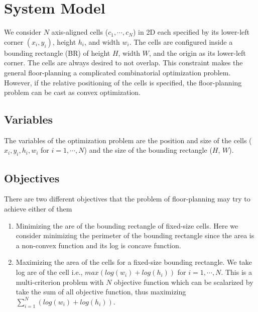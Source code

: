 \documentclass[12pt] {article}
\begin{document}
\section{System Model}
We consider $N$ axis-aligned cells ($c_{1}, \cdots, c_{N}$) in 2D each specified by its lower-left corner $(x_{i}, y_{i})$, height $h_{i}$, and width $w_{i}$. The cells are configured inside a bounding rectangle (BR) of height $H$, width $W$, and the origin as its lower-left corner. The cells are always desired to not overlap. This constraint makes the general floor-planning a complicated combinatorial optimization problem. However, if the relative positioning of the cells is specified, the floor-planning problem can be cast as convex optimization. 
\subsection*{Variables}
The variables of the optimization problem are the position and size of the cells ($x_{i}, y_{i}, h_{i}, w_{i}$ for $i=1,\cdots, N$) and the size of the bounding rectangle ($H$, $W$). 
\subsection*{Objectives} 
There are two different objectives that the problem of floor-planning may try to achieve either of them 
\begin{enumerate}
\item Minimizing the are of the bounding rectangle of fixed-size cells. Here we consider minimizing the perimeter of the bounding rectangle since the area is a non-convex function and its log is concave function.
\item Maximizing the area of the cells for a fixed-size bounding rectangle. We take log are of the cell i.e., $max (log(w_{i})+log(h_{i}))$ for $i=1,\cdots, N$. This is a multi-criterion problem with $N$ objective function which can be scalarized by take the sum of all objective function, thus maximizing $\sum_{i=1}^{N}(log(w_{i})+log(h_{i}))$.
\end{enumerate}
\end{document}
